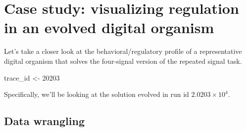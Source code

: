 \documentclass[
]{book}
\newenvironment{Shaded}{\begin{snugshade}}{\end{snugshade}}
\newcommand{\DecValTok}[1]{\textcolor[rgb]{0.00,0.00,0.81}{#1}}
\newcommand{\NormalTok}[1]{#1}
\newcommand{\StringTok}[1]{\textcolor[rgb]{0.31,0.60,0.02}{#1}}
\begin{document}
\hypertarget{case-study-visualizing-regulation-in-an-evolved-digital-organism}{%
\section{Case study: visualizing regulation in an evolved digital organism}\label{case-study-visualizing-regulation-in-an-evolved-digital-organism}}

Let's take a closer look at the behavioral/regulatory profile of a representative digital organism that solves the four-signal version of the repeated signal task.

\begin{Shaded}
\begin{Highlighting}[]
\NormalTok{trace\_id \textless{}{-}}\StringTok{ }\DecValTok{20203}
\end{Highlighting}
\end{Shaded}

Specifically, we'll be looking at the solution evolved in run id \ensuremath{2.0203\times 10^{4}}.

\hypertarget{data-wrangling}{%
\subsection{Data wrangling}\label{data-wrangling}}
\end{document}
